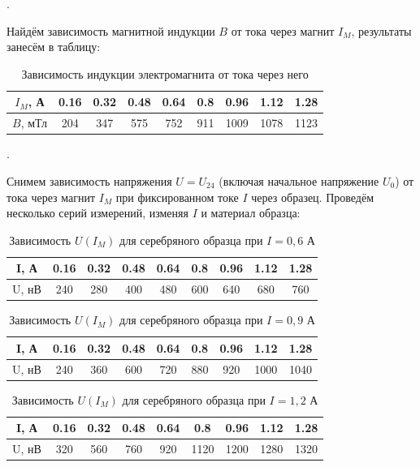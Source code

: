 \documentclass[a4paper, 12pt]{article}
\newcounter{Points}
\newcommand{\point}{\arabic{Points}. \addtocounter{Points}{1}}
\begin{document}
\point Найдём зависимость магнитной индукции $B$ от тока через магнит $I_M$, результаты занесём в таблицу:

\begin{table}[!h]
    \begin{tabular}{|c|c|c|c|c|c|c|c|c|} \hline
        $I_M$, А & 0.16 & 0.32 & 0.48 & 0.64 & 0.8 & 0.96 & 1.12 & 1.28 \\ \hline
        $B$, мТл & 204 & 347 & 575 & 752 & 911 & 1009 & 1078 & 1123 \\ \hline
    \end{tabular}
    \caption {Зависимость индукции электромагнита от тока через него}
\end{table}

\point Снимем зависимость напряжения $U = U_{24}$ (включая начальное напряжение $U_0$) от тока через магнит $I_M$ при фиксированном токе $I$ через образец. Проведём несколько серий измерений, изменяя $I$ и материал образца:

\begin{table}[!h]
    \begin{tabular}{|c|c|c|c|c|c|c|c|c|}
        \hline
        I, А & 0.16 & 0.32 & 0.48 & 0.64 & 0.8 & 0.96 & 1.12 & 1.28\\ \hline
        U, нВ & 240 & 280 & 400 & 480 & 600 & 640 & 680 & 760 \\ \hline
    \end{tabular}
    \caption {Зависимость $U (I_M)$ для серебряного образца при $I = 0,6$ А}
\end{table}

\begin{table}[!h]
    \begin{tabular}{|c|c|c|c|c|c|c|c|c|}
        \hline
        I, А & 0.16 & 0.32 & 0.48 & 0.64 & 0.8 & 0.96 & 1.12 & 1.28\\ \hline
        U, нВ & 240 & 360 & 600 & 720 & 880 & 920 & 1000 & 1040 \\ \hline
    \end{tabular}
    \caption {Зависимость $U (I_M)$ для серебряного образца при $I = 0,9$ А}
\end{table}

\begin{table}[!h]
    \begin{tabular}{|c|c|c|c|c|c|c|c|c|}
        \hline
        I, А & 0.16 & 0.32 & 0.48 & 0.64 & 0.8 & 0.96 & 1.12 & 1.28\\ \hline
        U, нВ & 320 & 560 & 760 & 920 & 1120 & 1200 & 1280 & 1320 \\ \hline
    \end{tabular}
    \caption {Зависимость $U (I_M)$ для серебряного образца при $I = 1,2$ А}
\end{table}
\end{document}
